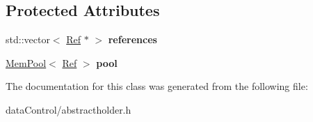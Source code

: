 \subsection*{Protected Attributes}
\begin{DoxyCompactItemize}
\item 
\hypertarget{class_tempest_1_1_abstract_holder_a20c1e018671da2af7514c8626bd4a9b1}{std\+::vector$<$ \hyperlink{struct_tempest_1_1_abstract_holder_1_1_impl_manip_1_1_ref}{Ref} $\ast$ $>$ {\bfseries references}}\label{class_tempest_1_1_abstract_holder_a20c1e018671da2af7514c8626bd4a9b1}

\item 
\hypertarget{class_tempest_1_1_abstract_holder_a007727dc9b2da1d226d3c88db57519d8}{\hyperlink{class_tempest_1_1_mem_pool}{Mem\+Pool}$<$ \hyperlink{struct_tempest_1_1_abstract_holder_1_1_impl_manip_1_1_ref}{Ref} $>$ {\bfseries pool}}\label{class_tempest_1_1_abstract_holder_a007727dc9b2da1d226d3c88db57519d8}

\end{DoxyCompactItemize}


The documentation for this class was generated from the following file\+:\begin{DoxyCompactItemize}
\item 
data\+Control/abstractholder.\+h\end{DoxyCompactItemize}
